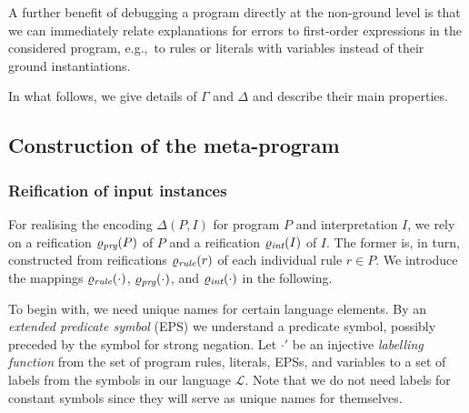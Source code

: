 \documentclass{tlp}
\newcommand{\meta}{\Gamma}
\newcommand{\reif}[1]{\Delta(#1)}
\renewcommand{\L}{\mathcal{L}}
\newcommand{\egc}{e.g.,\ }
\newcommand{\INPUT}{\reif{P,I}}
\begin{document}
A further benefit of debugging a program  directly at the non-ground level is that we can immediately 
relate explanations for errors to first-order expressions in  the considered program,
\egc to rules or literals with variables instead
of their ground instantiations.

In what follows, we give details of $\meta$ and $\Delta$ and describe their main properties.

\subsection{Construction of the meta-program}
\subsubsection{Reification of input instances}
For realising the encoding $\INPUT$ for program $P$ and interpretation $I$,
we rely on a reification $\varrho_{\text{\it{prg}}}(P)$ of $P$ and a reification $\varrho_{\text{\it{int}}}(I)$ of $I$.
The former is, in turn, constructed from reifications $\varrho_{\text{\it{rule}}}(r)$ of each individual rule $r\in P$.
We introduce the mappings $\varrho_{\text{\it{rule}}}(\cdot)$, $\varrho_{\text{\it{prg}}}(\cdot)$, and $\varrho_{\text{\it{int}}}(\cdot)$ in the following.

To begin with, we need unique names for certain language elements.
By an \emph{extended predicate symbol} (EPS) we understand a predicate symbol, possibly preceded by  
the symbol for strong negation.
Let 
$\cdot'$ be an injective \emph{labelling function} from the set of program rules, literals, EPSs, and variables to a set of labels
from the symbols in our language $\L$. 
Note that we do not need labels for constant symbols since they will serve as unique names for themselves.
\end{document}
